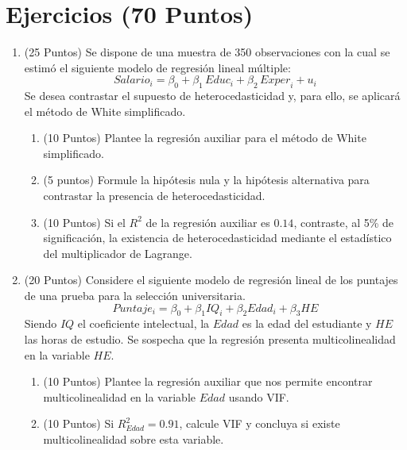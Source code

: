 \documentclass[10pt,a4paper]{article}
\begin{document}
\section{Ejercicios (70 Puntos)}

\begin{enumerate}

\item (25 Puntos) Se dispone de una muestra de 350 observaciones con la cual se estimó el siguiente modelo de regresión lineal múltiple:
$$Salario_i = \beta_0 + \beta_1\,\textit{Educ}_i + \beta_2\,\textit{Exper}_i + u_i$$
Se desea contrastar el supuesto de heterocedasticidad y, para ello, se aplicará el método de White simplificado.
\begin{enumerate}
    \item (10 Puntos) Plantee la regresión auxiliar para el método de White simplificado.
    
    
    \item (5 puntos) Formule la hipótesis nula y la hipótesis alternativa para contrastar la presencia de heterocedasticidad.
    
    \item (10 Puntos) Si el $R^2$ de la regresión auxiliar es $0.14$, contraste, al 5\% de significación, la existencia de heterocedasticidad mediante el estadístico del multiplicador de Lagrange.
    
\end{enumerate}

\item (20 Puntos) Considere el siguiente modelo de regresión lineal  de los puntajes de una prueba para la selección universitaria.
$$Puntaje_i = \beta_0 + \beta_1 IQ_i + \beta_2 Edad_i + \beta_3 HE$$
Siendo $IQ$ el coeficiente intelectual, la $Edad$ es la edad del estudiante y $HE$ las horas de estudio. Se sospecha que la regresión presenta multicolinealidad en la variable $HE$. 

\begin{enumerate}
    \item  (10 Puntos) Plantee la regresión auxiliar que nos permite encontrar multicolinealidad en la variable $Edad$ usando VIF. 
    \item (10 Puntos) Si $R^2_{Edad} = 0.91$, calcule VIF y concluya si existe multicolinealidad sobre esta variable.

\end{enumerate}


\end{enumerate}
\end{document}
